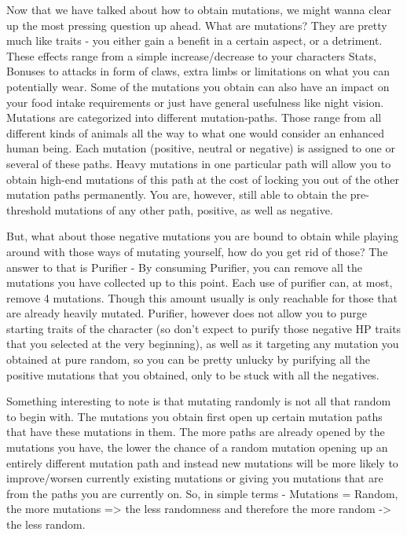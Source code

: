 \documentclass[11pt]{report}
\begin{document}
Now that we have talked about how to obtain mutations, we might wanna clear up the most pressing question up ahead. What are mutations?
They are pretty much like traits - you either gain a benefit in a certain aspect, or a detriment. These effects range from a simple increase/decrease to your characters Stats, Bonuses to attacks in form of claws, extra limbs or limitations on what you can potentially wear. Some of the mutations you obtain can also have an impact on your food intake requirements or just have general usefulness like night vision. Mutations are categorized into different mutation-paths. Those range from all different kinds of animals all the way to what one would consider an enhanced human being. Each mutation (positive, neutral or negative) is assigned to one or several of these paths. Heavy mutations in one particular path will allow you to obtain high-end mutations of this path at the cost of locking you out of the other mutation paths permanently. You are, however, still able to obtain the pre-threshold mutations of any other path, positive, as well as negative.

But, what about those negative mutations you are bound to obtain while playing around with those ways of mutating yourself, how do you get rid of those? The answer to that is Purifier - By consuming Purifier, you can remove all the mutations you have collected up to this point. Each use of purifier can, at most, remove 4 mutations. Though this amount usually is only reachable for those that are already heavily mutated. Purifier, however does not allow you to purge starting traits of the character (so don't expect to purify those negative HP traits that you selected at the very beginning), as well as it targeting any mutation you obtained at pure random, so you can be pretty unlucky by purifying all the positive mutations that you obtained, only to be stuck with all the negatives.

Something interesting to note is that mutating randomly is not all that random to begin with. The mutations you obtain first open up certain mutation paths that have these mutations in them. The more paths are already opened by the mutations you have, the lower the chance of a random mutation opening up an entirely different mutation path and instead new mutations will be more likely to improve/worsen currently existing mutations or giving you mutations that are from the paths you are currently on. So, in simple terms - Mutations = Random, the more mutations => the less randomness and therefore the more random -> the less random.
\end{document}
